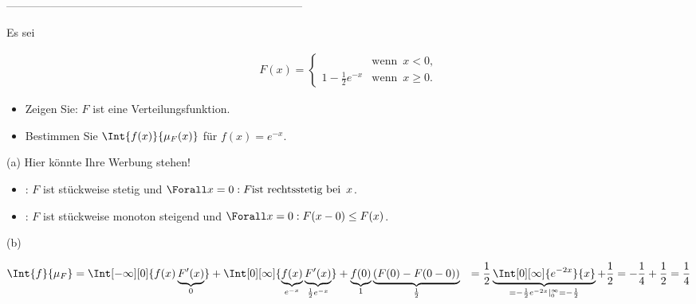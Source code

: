 --------------------------------------------------------------------------------

\begin{exercise}

Es sei

\begin{align*}
  F(x) =
  \begin{cases}
                            & \text{wenn} \enspace x < 0, \\
    1 - \frac{1}{2} e^{-x}  & \text{wenn} \enspace x \geq 0.
  \end{cases}
\end{align*}

\begin{itemize}
  \item[(a)] Zeigen Sie: $F$ ist eine Verteilungsfunktion.
  \item[(b)] Bestimmen Sie $\Int{f(x)}{\mu_F(x)}$ für $f(x) = e^{-x}$.
\end{itemize}

\end{exercise}

\begin{solution}

(a) Hier könnte Ihre Werbung stehen!

\begin{itemize}

  \item {}: $F$ ist stückweise stetig und $\Forall x = 0: F \text{ist rechtsstetig bei} \enspace x$.

  \item {}: $F$ ist stückweise monoton steigend und $\Forall x = 0: F(x - 0) \leq F(x)$.

\end{itemize}

(b)

\begin{align*}
  \Int{f}{\mu_F}
  & =
  \Int[-\infty][0]{f(x) \underbrace{F^\prime(x)}_0}
  +
  \Int[0][\infty]
  {
    \underbrace{f(x)}_{e^{-x}}
    \underbrace{F^\prime(x)}_{\frac{1}{2} e^{-x}}
  }
  +
  \underbrace{f(0)}_1 \underbrace{(F(0) - F(0 - 0))}_\frac{1}{2}
  & =
  \frac{1}{2} \underbrace
  {
    \Int[0][\infty]{e^{-2x}}{x}
  }_{
    = -\frac{1}{2} e^{-2x} |_0^\infty
    = -\frac{1}{2}
  }
  +
  \frac{1}{2}
  =
  -\frac{1}{4} + \frac{1}{2} = \frac{1}{4}
\end{align*}

\end{solution}


